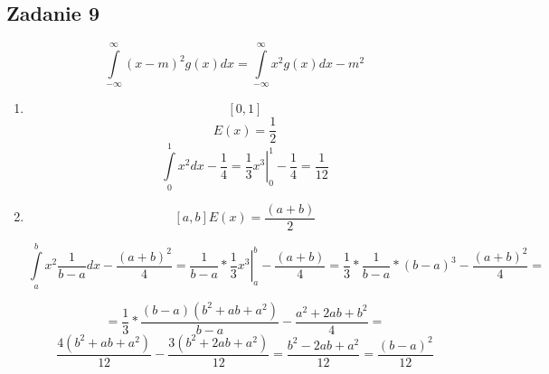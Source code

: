 \subsection{Zadanie 9}

$$
\int\limits_{-\infty}^{\infty}(x-m)^{2}g(x)dx= \int\limits_{-\infty}^{\infty}x^{2}g(x)dx-m^{2}
$$

\begin{enumerate}[label=(\alph*)]
\item
$$ [0,1] $$
$$ E(x)=\frac{1}{2} $$
$$
\int\limits_{0}^{1}x^{2}dx - \frac{1}{4} =
\left. \frac{1}{3}x^{3} \right|_{0}^{1} - \frac{1}{4} = \frac{1}{12}
$$

\item
$$[a,b]E(x)=\frac{(a+b)}{2}$$

$$
\int\limits_{a}^{b}x^{2}\frac{1}{b-a}dx - \frac{(a+b)^{2}}{4} =
\left. \frac{1}{b-a} * \frac{1}{3}x^{3} \right|_{a}^{b} - \frac{(a+b)}{4} =
\frac{1}{3} * \frac{1}{b-a} * (b-a)^{3} - \frac{(a+b)^{2}}{4}=
$$

$$
= \frac{1}{3} * \frac{(b-a)(b^{2} + ab + a^{2})}{b - a} - \frac{a^{2}+ 2ab +
b^{2}}{4} =
$$
$$
\frac{4(b^{2} + ab + a^{2})}{12} - \frac{3(b^{2} + 2ab + a^{2})}{12} =
\frac{b^{2} - 2ab + a^{2}}{12}= \frac{(b - a)^{2}}{12}
$$
\end{enumerate}
